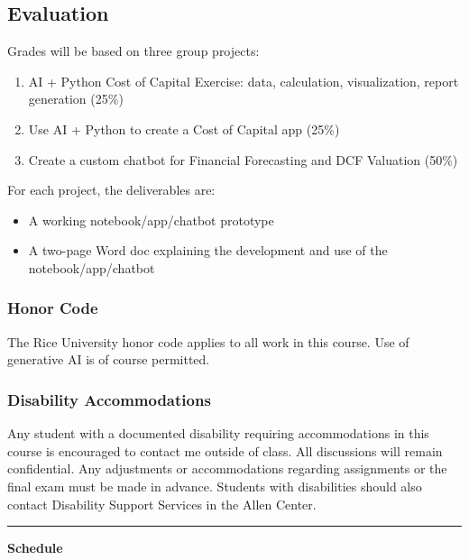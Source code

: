 \documentclass[11pt]{article}
\begin{document}
\subsection*{Evaluation}

Grades will be based on three group projects:
\begin{enumerate}\setlength{\itemsep}{0pt}
\item AI + Python Cost of Capital Exercise: data, calculation, visualization, report generation (25\%)
\item Use AI + Python to create a Cost of Capital app (25\%)
\item Create a custom chatbot for Financial Forecasting and DCF Valuation  (50\%)  
\end{enumerate}
For each project, the deliverables are:
\begin{itemize}\setlength{\itemsep}{0pt}
\item A working notebook/app/chatbot prototype
\item A two-page Word doc explaining the development and use of the notebook/app/chatbot
\end{itemize}

\subsubsection*{Honor Code}
The Rice University honor code applies to all work in this course. Use of generative AI is of course permitted.

\subsubsection*{Disability Accommodations}
Any student with a documented disability requiring accommodations in this course is encouraged to contact me outside of class. All discussions will remain confidential. Any adjustments or accommodations regarding assignments or the final exam must be made in advance. Students with disabilities should also contact Disability Support Services in the Allen Center.

\vspace{1cm}
\hrule
\vspace{0.5cm}

\begin{center}
\textbf{\Large  Schedule}
\end{center}
\end{document}
